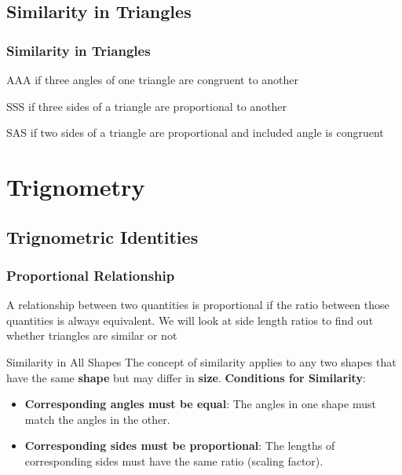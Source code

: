 \documentclass{beamer}
\begin{document}
     \subsection{Similarity in Triangles}
        \begin{frame}
            \frametitle{Similarity in Triangles}
            \begin{block}{AAA}
                if three angles of one triangle are congruent to another 
            \end{block}
            \begin{block}{SSS}
                if three sides of a triangle are proportional to another
            \end{block}
            \begin{block}{SAS}
                if two sides of a triangle are proportional and included angle is congruent 
            \end{block}
        \end{frame}

\section{Trignometry}
\subsection{Trignometric Identities}



\begin{frame}
    \frametitle{Proportional Relationship}
    A relationship between two quantities is proportional if the ratio between those quantities is always equivalent. We will look at side length ratios to find out whether triangles are similar or not
\end{frame}

\begin{frame}{Similarity in All Shapes}
  The concept of similarity applies to any two shapes that have the same \textbf{shape} but may differ in \textbf{size}.
    \vspace{10pt}
    \textbf{Conditions for Similarity}:
    \begin{itemize}
        \item \textbf{Corresponding angles must be equal}: The angles in one shape must match the angles in the other.
        \item \textbf{Corresponding sides must be proportional}: The lengths of corresponding sides must have the same ratio (scaling factor).
    \end{itemize}
\end{frame}
\end{document}
